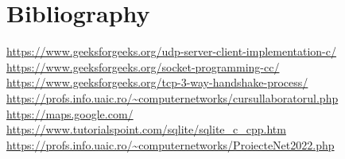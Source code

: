 \documentclass{article}
\begin{document}
\section{\textbf{Bibliography}}
\url{https://www.geeksforgeeks.org/udp-server-client-implementation-c/} \newline
\url{https://www.geeksforgeeks.org/socket-programming-cc/} \newline
\url{https://www.geeksforgeeks.org/tcp-3-way-handshake-process/} \newline
\url{https://profs.info.uaic.ro/~computernetworks/cursullaboratorul.php} \newline
\url{https://maps.google.com/} \newline
\url{https://www.tutorialspoint.com/sqlite/sqlite\_c\_cpp.htm} \newline
\url{https://profs.info.uaic.ro/~computernetworks/ProiecteNet2022.php} \newline
\end{document}
